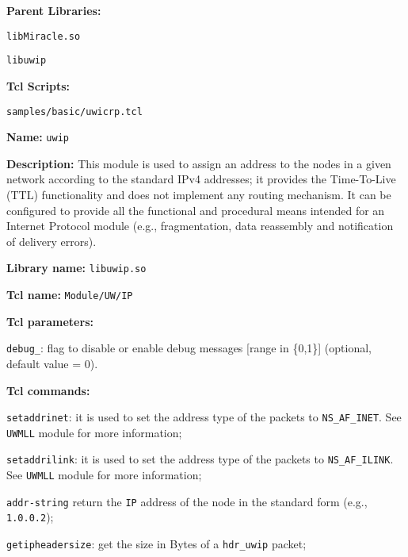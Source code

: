\begin{description}
   \item {\bf Parent Libraries:}
    \begin{description}
     \item {\tt libMiracle.so}
     \item {\tt libuwip}
    \end{description}
   \item {\bf Tcl Scripts:} 
    \begin{description}
     \item {\tt samples/basic/uwicrp.tcl}
    \end{description}
\end{description}

\vspace{1 cm}

\begin{description}
   \item {\bf Name:} {\tt uwip}
   \item {\bf Description:} This module is used to assign an address to the nodes in a given network according to the standard IPv4 addresses; it provides the Time-To-Live (TTL) functionality and does not implement any routing mechanism. It can be configured to provide all the functional and procedural means intended for an Internet Protocol module (e.g., fragmentation, data reassembly and notification of delivery errors).
   \item {\bf Library name:} {\tt libuwip.so}
   \item {\bf Tcl name:} {\tt Module/UW/IP}
   \item {\bf Tcl parameters:}
    \begin{description}
     \item {\tt debug\_}: flag to disable or enable debug messages [range in \{0,1\}] (optional, default value = 0).
    \end{description}
   \item {\bf Tcl commands:}
    \begin{description}
     \item {\tt setaddrinet}: it is used to set the address type of the packets to {\tt NS\_AF\_INET}. See {\tt UWMLL} module for more information;
     \item {\tt setaddrilink}: it is used to set the address type of the packets to {\tt NS\_AF\_ILINK}. See {\tt UWMLL} module for more information;
     \item {\tt addr-string} return the {\tt IP} address of the node in the standard form (e.g., {\tt 1.0.0.2});
     \item {\tt getipheadersize}: get the size in Bytes of a {\tt hdr\_uwip} packet;

\end{description}
\end{description}

